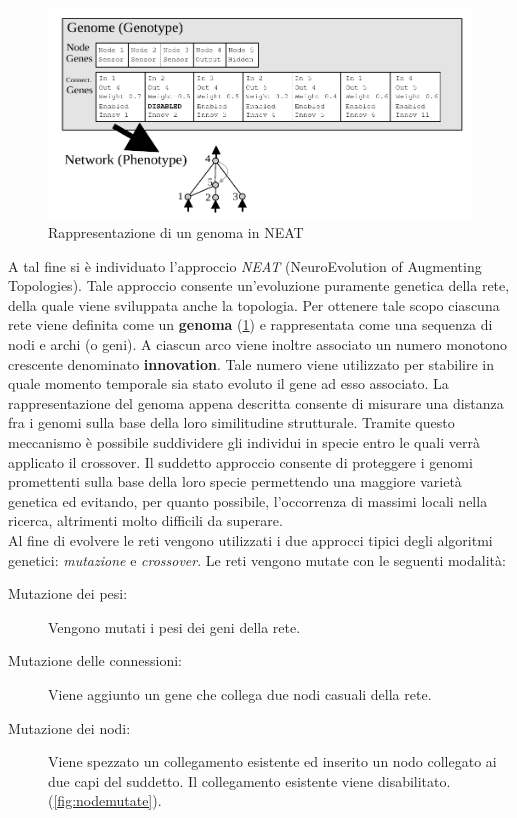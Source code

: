 \begin{figure}
	\includegraphics[width=\textwidth]{img/neat-genome.png}
	\caption{Rappresentazione di un genoma in NEAT \cite{stanley2002evolving}}
	\label{fig:neatgenome}
\end{figure}
A tal fine si è individuato l'approccio \emph{NEAT}
(NeuroEvolution of Augmenting Topologies)\cite{stanley2002evolving}. Tale
approccio consente un'evoluzione puramente genetica della rete, della quale 
viene sviluppata anche la
topologia. Per ottenere tale scopo ciascuna rete viene definita come un
\textbf{genoma} (\cref{fig:neatgenome}) e rappresentata come una sequenza di
nodi e archi (o geni).
A ciascun arco viene inoltre associato un numero monotono crescente denominato
\textbf{innovation}. Tale numero viene utilizzato per stabilire in quale momento
temporale sia stato evoluto il gene ad esso associato. La rappresentazione del
genoma appena descritta consente di misurare una distanza fra i genomi sulla
base della loro similitudine strutturale. Tramite questo meccanismo è possibile
suddividere gli individui in specie entro le quali verrà applicato il crossover.
Il suddetto approccio consente di proteggere i genomi promettenti sulla base
della loro specie permettendo una maggiore varietà genetica ed evitando, per 
quanto possibile, l'occorrenza di massimi locali nella ricerca, altrimenti molto
difficili da superare.\\

Al fine di evolvere le reti vengono utilizzati i due approcci tipici degli
algoritmi genetici: \emph{mutazione} e \emph{crossover}.
Le reti vengono mutate con le seguenti modalità:
\begin{description}
	\item[Mutazione dei pesi:] Vengono mutati i pesi dei geni della rete.
	\item[Mutazione delle connessioni:] Viene aggiunto un gene che collega
	due nodi casuali della rete.
	\item[Mutazione dei nodi:] Viene spezzato un collegamento esistente ed
	inserito un nodo collegato ai due capi del suddetto. Il collegamento 
	esistente viene disabilitato.
	(\cref{fig:nodemutate}).
\end{description}

